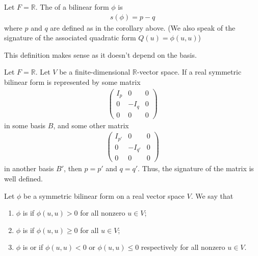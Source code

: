 \begin{definition}[Signature]
	Let $F = \mathbb R$.
	The  of a bilinear form $\phi$ is
	\begin{align*}
		s(\phi) = p - q
	\end{align*}
	where $p$ and $q$ are defined as in the corollary above.
	(We also speak of the signature of the associated quadratic form $Q(u) = \phi(u, u)$)
\end{definition}

This definition makes sense as it doesn't depend on the basis.

\begin{theorem}
	Let $F = \mathbb R$.
	Let $V$ be a finite-dimensional $\mathbb R$-vector space.
	If a real symmetric bilinear form is represented by some matrix
	\begin{align*}
		\begin{pmatrix}
			I_p & 0    & 0 \\
			0   & -I_q & 0 \\
			0   & 0    & 0
		\end{pmatrix}
	\end{align*}
	in some basis $B$, and some other matrix
	\begin{align*}
		\begin{pmatrix}
			I_{p'} & 0       & 0 \\
			0      & -I_{q'} & 0 \\
			0      & 0       & 0
		\end{pmatrix}
	\end{align*}
	in another basis $B'$, then $p = p'$ and $q = q'$.
	Thus, the signature of the matrix is well defined.
\end{theorem}

\begin{definition}
	Let $\phi$ be a symmetric bilinear form on a real vector space $V$.
	We say that
	\begin{enumerate}
		\item $\phi$ is  if $\phi(u,u) > 0$ for all nonzero $u \in V$;
		\item $\phi$ is  if $\phi(u,u) \geq 0$ for all $u \in V$;
		\item $\phi$ is  or  if $\phi(u,u) < 0$ or $\phi(u,u) \leq 0$ respectively for all nonzero $u \in V$.
	\end{enumerate}
\end{definition}

